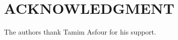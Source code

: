 \documentclass[letterpaper, 10 pt, conference]{ieeeconf}  %
\begin{document}











\section*{ACKNOWLEDGMENT}
The authors thank Tamim Asfour for his support.










\end{document}
